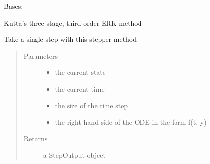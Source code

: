 \documentclass[letterpaper,10pt,english]{sphinxmanual}
\begin{document}

\begin{fulllineitems}
\label{\detokenize{spitfire.time.methods:spitfire.time.methods.ExplicitRungeKutta3Kutta}}
Bases: {\hyperref[\detokenize{spitfire.time.methods:spitfire.time.methods.ExplicitRungeKutta}]{}}

Kutta’s three-stage, third-order ERK method

\begin{fulllineitems}
\label{\detokenize{spitfire.time.methods:spitfire.time.methods.ExplicitRungeKutta3Kutta.single_step}}
Take a single step with this stepper method
\begin{quote}\begin{description}
\item[{Parameters}] \leavevmode\begin{itemize}
\item {} 
 \textendash{} the current state

\item {} 
 \textendash{} the current time

\item {} 
 \textendash{} the size of the time step

\item {} 
 \textendash{} the right-hand side of the ODE in the form f(t, y)

\end{itemize}

\item[{Returns}] \leavevmode
a StepOutput object

\end{description}\end{quote}

\end{fulllineitems}


\end{fulllineitems}
\end{document}
